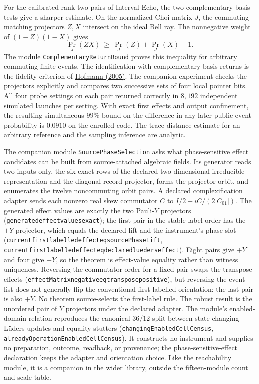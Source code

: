 \documentclass[11pt]{article}
\renewcommand{\_}{\textunderscore\allowbreak}
\theoremstyle{remark}
\begin{document}
For the calibrated rank-two pairs of Interval Echo, the two complementary
basis tests give a sharper estimate. On the normalized Choi matrix $J$,
the commuting matching projectors $Z,X$ intersect on the ideal Bell ray.
The nonnegative weight of $(1-Z)(1-X)$ gives
\[
 \Pr_J(ZX)\ \geq\ \Pr_J(Z)+\Pr_J(X)-1 .
\]
The module \texttt{ComplementaryReturnBound} proves this inequality for
arbitrary commuting finite events. The identification with complementary
basis returns is the fidelity criterion of
\href{https://doi.org/10.1103/PhysRevLett.94.160504}{Hofmann (2005)}.
The companion experiment checks the projectors explicitly and compares
two successive sets of four local pointer bits. All four probe settings
on each pair returned correctly in $8{,}192$ independent simulated
launches per setting. With exact first effects and output confinement,
the resulting simultaneous $99\%$ bound on the difference in any later
public event probability is $0.0910$ on the enrolled code. The
trace-distance estimate for an arbitrary reference and the sampling
inference are analytic.

The companion module \texttt{SourcePhaseSelection} asks what phase-sensitive
effect candidates can be built from source-attached algebraic fields. Its
generator reads two inputs only, the six exact rows of the declared
two-dimensional irreducible representation and the diagonal record projector,
forms the projector orbit, and enumerates the twelve noncommuting orbit pairs.
A declared complexification adapter sends each nonzero real skew commutator
$C$ to $I/2-iC/(2|C_{01}|)$. The generated effect values are exactly the two Pauli-$Y$
projectors (\texttt{generated\_effect\_values\_exact}); the first pair in
the stable label order has the $+Y$ projector, which equals the
declared lift and the instrument's phase slot
(\texttt{current\_first\_labelled\_effect\_eq\_sourcePhaseLift},
\texttt{current\_first\_labelled\_effect\_eq\_declared\_lueders\_effect}).
Eight pairs give $+Y$ and four give $-Y$, so the theorem is effect-value
equality rather than witness uniqueness. Reversing the commutator order for a
fixed pair swaps the transpose effects
(\texttt{effectMatrix\_negative\_eq\_transpose\_positive}), but reversing the
event list does not generally flip the conventional first-labelled orientation: the last
pair is also $+Y$. No theorem source-selects the first-label rule. The robust
result is the unordered pair of $Y$ projectors under the declared adapter. The
module's enabled-domain relation reproduces the canonical $36/12$ split
between state-changing L\"uders updates and equality stutters
(\texttt{changingEnabledCellCensus},
\texttt{alreadyOperationEnabledCellCensus}). It constructs no instrument
and supplies no preparation, outcome, readback, or provenance; the
phase-sensitive-effect declaration keeps the adapter and orientation choice. Like the
reachability module, it is a companion in the wider library, outside the
fifteen-module count and scale table.
\end{document}
